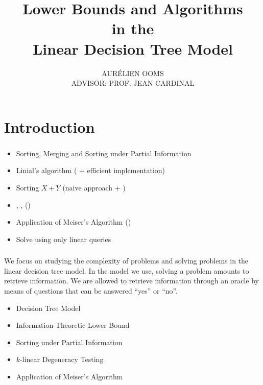 \documentclass[10pt,xcolor=x11names,dvipsnames,hyperref={colorlinks=false,breaklinks=true,bookmarks=true}]{beamer}
\begin{document}
\title[]{\textbf{Lower Bounds and Algorithms\\ in the\\ Linear Decision Tree Model\vspace{3mm}}}
\author[]{\large AURÉLIEN OOMS\\ADVISOR: PROF. JEAN CARDINAL\vspace{5mm}}
\date{}

\begin{frame}
\titlepage{}
\end{frame}

\section{Introduction}
\begin{frame}\frametitle{\insertsection}\justifying
{}
\begin{itemize}[label={\color{prussianblue}$\bullet$},itemsep=6pt]
\item Sorting, Merging and Sorting under Partial Information\pause
\item Linial's algorithm (\citet*{linial:1984} + {efficient implementation})\pause
\item Sorting \(X+Y\) (naive approach + \citet*{fredman:1976})\pause
\item \threeSUM{}, \kSUM{}, \kLDT{} (\citet*{gronlund:2014})\pause
\item {Application} of Meiser's Algorithm (\citet*{meiser:1993})\pause
\item {Solve \kSUM{} using only  linear queries}
\end{itemize}
\end{frame}

\begin{frame}\frametitle{\insertsection}\justifying
We focus on studying the complexity of problems and solving problems
in the linear decision tree model. In the model we use, solving a problem
amounts to retrieve information. We are allowed to retrieve information
through an oracle by means of questions that
can be answered ``yes'' or ``no''.\\[7mm]\pause
{}
\begin{itemize}[label={\color{prussianblue}$\bullet$},itemsep=6pt]
\item Decision Tree Model\pause
\item Information-Theoretic Lower Bound\pause
\item Sorting under Partial Information\pause
\item \(k\)-linear Degeneracy Testing\pause
\item Application of Meiser's Algorithm
\end{itemize}
\end{frame}
\end{document}
